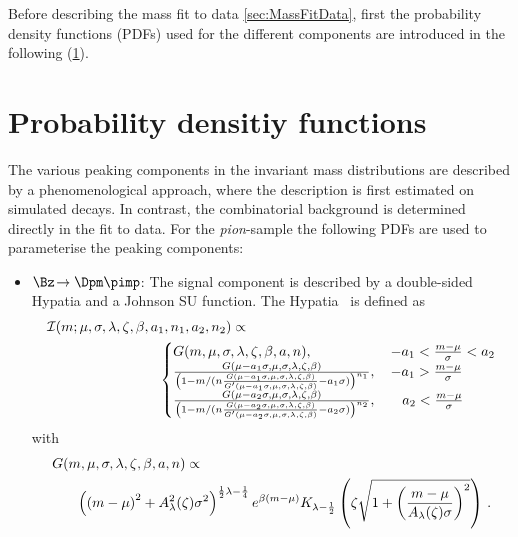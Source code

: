 Before describing the mass fit to data {\cref{sec:MassFitData}}, first the probability density functions (PDFs) used for the different components are introduced in the following (\cref{sec:PDFs}).

\section{Probability densitiy functions}
\label{sec:PDFs}

The various peaking components in the invariant mass distributions are described by a phenomenological approach, where the description is first
estimated on simulated decays.
In contrast, the combinatorial background is determined directly in the fit to data.
For the \emph{pion}-sample the following PDFs are used to parameterise the peaking components:
\begin{itemize}
	\item $\Bz\!\to\Dpm\pimp$: The signal component is described by a double-sided Hypatia and a Johnson SU function.
	The Hypatia~\cite{Santos:2013ky} is defined as
	\begin{equation}
	\begin{aligned}
	&\mathcal{I}(m;\mu,\sigma,\lambda,\zeta,\beta,a_1,n_1,a_2,n_2) \propto\\
	&\hspace{2.8cm}\begin{cases}
	G(m,\mu,\sigma,\lambda,\zeta,\beta,a,n), &\,   - a_1 < \frac{m - \mu}{\sigma} < a_2 \\
	\frac{G(\mu - a_1 \sigma,\mu,\sigma,\lambda,\zeta,\beta)}{\left(1 - m/(n \frac{G(\mu - a_1\sigma,\mu,\sigma,\lambda,\zeta,\beta)}{G^\prime(\mu - a_1 \sigma,\mu,\sigma,\lambda,\zeta,\beta)} -a_1 \sigma)\right)^{n_1}},	&\,  - a_1 > \frac{m - \mu}{\sigma} \\
	\frac{G(\mu - a_2 \sigma,\mu,\sigma,\lambda,\zeta,\beta)}{\left(1 - m/(n \frac{G(\mu - a_2\sigma,\mu,\sigma,\lambda,\zeta,\beta)}{G^\prime(\mu - a_2 \sigma,\mu,\sigma,\lambda,\zeta,\beta)} -a_2 \sigma)\right)^{n_2}},	&\quad a_2 < \frac{m - \mu}{\sigma} \\
	\end{cases}
	\label{eq:ipatia}
	\end{aligned}
	\end{equation}
	with
	\begin{equation}
	\begin{aligned}
	&G(m,\mu,\sigma,\lambda,\zeta,\beta,a,n)\propto\\
	&\hspace{0.6cm}\left(\left(m-\mu\right)^2+A_\lambda^2(\zeta)\sigma^2\right)^{\frac{1}{2}\lambda-\frac{1}{4}}e^{\beta\left(m-\mu\right)}K_{\lambda-\frac{1}{2}}\left(\zeta\sqrt{1+\left(\frac{m-\mu}{A_\lambda(\zeta)\sigma}\right)^2}\right)\,.

\end{aligned}
\end{equation}
\end{itemize}
